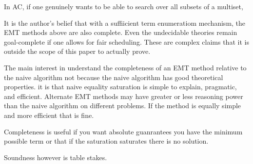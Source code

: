 In AC, if one genuinely wants to be able to search over all subsets of a multiset, 


It is the author's belief that with a suffiicient term enumeratiom mechanism, the EMT methods above are also complete. Even the undecidable theories remain goal-complete if one allows for fair scheduling. These are complex claims that it is outside the scope of this paper to actually prove.

The main interest in understand the completeness of an EMT method relative to the naive algorithm not because the naive algorithm has good theoretical properties. it is that naive equality saturation is simple to explain, pragmatic, and efficient. Alternate EMT methods may have greater or less reasoning power than the naive algorithm on different problems. If the method is equally simple and more efficient that is fine.

Completeness is useful if you want absolute guanrantees you have the minimum possible term or that if the saturation saturates there is no solution.

Soundness however is table stakes.

